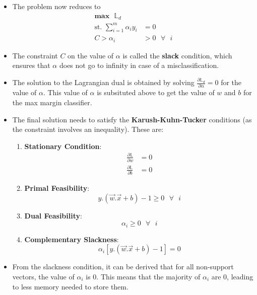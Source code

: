 \documentclass{article}
\theoremstyle{plain}
\theoremstyle{definition}
\begin{document}
\begin{itemize}
    \item The problem now reduces to
    \begin{align*} 
        \mathbf{max}\text{ }\mathbb{L}_d & \\
        \text{st. } \sum_{i=1}^{m} \alpha_i y_i &= 0 \\
        C > \alpha_i &> 0\text{ }\forall\text{ }i
    \end{align*}
    
    \item The constraint $C$ on the value of $\alpha$ is called the \textbf{slack} condition, which ensures that $\alpha$ does not go to infinity in case of a misclassification. 
    
    \item The solution to the Lagrangian dual is obtained by solving $\frac{\partial \mathbb{L}_d}{\partial \alpha} = 0$ for the value of $\alpha$. This value of $\alpha$ is subsituted above to get the value of $w$ and $b$ for the max margin classifier. 
    
    \item The final solution needs to satisfy the \textbf{Karush-Kuhn-Tucker} conditions (as the constraint involves an inequality). These are:
    \begin{enumerate}
        \item \textbf{Stationary Condition}:
            \begin{align*}
                \frac{\partial \mathbb{L}}{\partial w} &= 0\\
                \frac{\partial \mathbb{L}}{\partial b} &= 0
            \end{align*}
            
        \item \textbf{Primal Feasibility}: 
        \begin{equation*}
            y.(\overrightarrow{w}.\overrightarrow{x} + b) -1 \ge 0\text{ }\forall\text{ }i
        \end{equation*}
        
        \item \textbf{Dual Feasibility}:
        \begin{equation*}
            \alpha_i\ge0\text{ }\forall\text{ }i
        \end{equation*}
        
        \item \textbf{Complementary Slackness}:
        \begin{equation*}
            \alpha_i [y.(\overrightarrow{w}.\overrightarrow{x} + b) -1] = 0
        \end{equation*}
    \end{enumerate}
    
    \item From the slackness condition, it can be derived that for all non-support vectors, the value of $\alpha_i$ is 0. This means that the majority of $\alpha_i$ are 0, leading to less memory needed to store them. 
\end{itemize}
\end{document}
